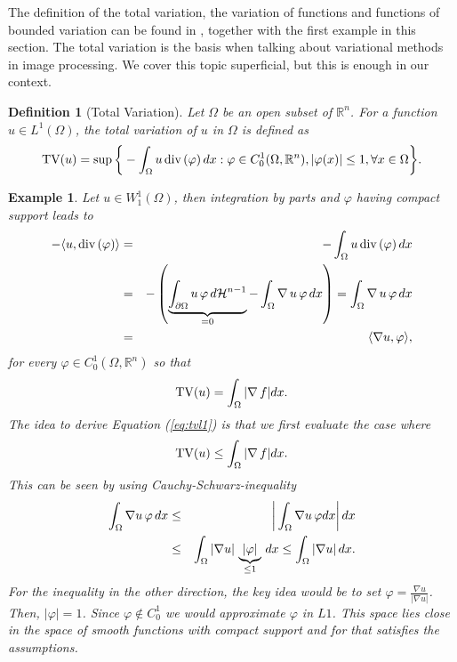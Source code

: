 \documentclass[abstracton]{scrreprt}
\newtheorem{definition}[theorem]{Definition}
\newtheorem{example}[theorem]{Example}
\begin{document}
        The definition of the total variation, the variation of functions and functions of bounded variation can be found in \cite{Giusti}, together with the first example in this section. The total variation is the basis when talking about variational methods in image processing. We cover this topic superficial, but this is enough in our context.
        \begin{definition}[Total Variation] %
        \label{def:total_variation}
            Let $\Omega$ be an open subset of $\mathbb{R}^{n}$. For a function $u \in L^{1}(\Omega)$, the \textnormal{total variation} of $u$ in $\Omega$ is defined as
                $$
                    \textnormal{TV}(u) = \sup \bigg\{ -\int_{\Omega} u\, \textnormal{div}\, (\varphi)\, dx : \varphi \in C^{1}_{0}(\Omega, \mathbb{R}^{n}), |\varphi(x)| \le 1, \forall x \in \Omega \bigg\}.
                $$
        \end{definition}
        \begin{example} %
        \label{prop:u_is_smooth}
            Let $u \in W_{1}^{1}(\Omega)$, then integration by parts and $\varphi$ having compact support leads to
                \begin{eqnarray}
                    -\langle u, \textnormal{div}\,(\varphi) \rangle &=& - \int_{\Omega} u\, \textnormal{div}\, (\varphi)\, dx \notag \\
                    &=& - \left( \underbrace{\int_{\partial\Omega} u\, \varphi\, d\mathcal{H}^{n-1}}_{= 0} - \int_{\Omega} \nabla\,u\, \varphi\, dx \right) = \int_{\Omega} \nabla\,u\,\varphi\,dx \notag \\
                    &=& \langle \nabla u, \varphi \rangle,
                    \label{eq:nabla_equals_minus_divergence}
                \end{eqnarray}
            for every $\varphi \in C^{1}_{0}(\Omega, \mathbb{R}^{n})$ so that
                \begin{equation}
                    \textnormal{TV}(u) = \int_{\Omega} |\nabla\,f| dx.
                    \label{eq:tvl1}
                \end{equation}
            The idea to derive Equation (\ref{eq:tvl1}) is that we first evaluate the case where
                $$
                    \textnormal{TV}(u) \le \int_{\Omega} |\nabla\,f| dx.
                $$
            This can be seen by using Cauchy-Schwarz-inequality
                \begin{eqnarray}
                    \int_{\Omega} \nabla u \, \varphi \, dx &\le& \bigg| \int_{\Omega} \nabla u \, \varphi dx \bigg| \, dx \notag \\
                    &\le& \int_{\Omega} |\nabla u| \, \underbrace{|\varphi|}_{\le 1} \, dx \le \int_{\Omega} |\nabla u| \, dx. \notag
                \end{eqnarray}
            For the inequality in the other direction, the key idea would be to set $\varphi = \frac{\nabla u}{|\nabla u|}$. Then, $|\varphi| = 1$. Since $\varphi \notin C_{0}^{1}$ we would approximate $\varphi$ in $L1$. This space lies close in the space of smooth functions with compact support and for that satisfies the assumptions.
        \end{example}
\end{document}
